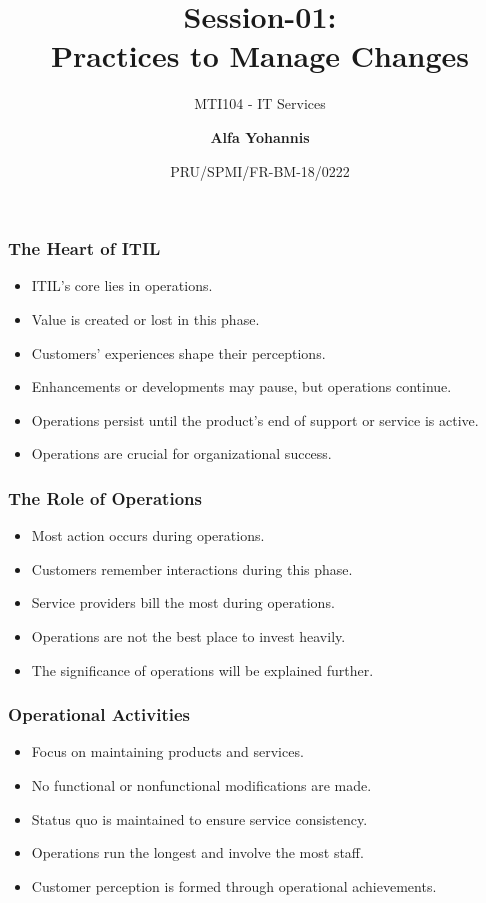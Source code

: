 \documentclass[aspectratio=169, table]{beamer}
\subtitle{MTI104 - IT Services}
\title{Session-01:\\\LARGE{Practices to Manage Changes\\}}
\date[Serial]{\scriptsize {PRU/SPMI/FR-BM-18/0222}}
\author[Pradita]{\small{\textbf{Alfa Yohannis}}}
\begin{document}
\frame{\titlepage}

\begin{frame}
	\frametitle{The Heart of ITIL}
	
	\begin{itemize}
		\item ITIL's core lies in operations.
		\item Value is created or lost in this phase.
		\item Customers' experiences shape their perceptions.
		\item Enhancements or developments may pause, but operations continue.
		\item Operations persist until the product’s end of support or service is active.
		\item Operations are crucial for organizational success.
	\end{itemize}
\end{frame}

\begin{frame}
	\frametitle{The Role of Operations}
	
	\begin{itemize}
		\item Most action occurs during operations.
		\item Customers remember interactions during this phase.
		\item Service providers bill the most during operations.
		\item Operations are not the best place to invest heavily.
		\item The significance of operations will be explained further.
	\end{itemize}
\end{frame}

\begin{frame}
	\frametitle{Operational Activities}
	
	\begin{itemize}
		\item Focus on maintaining products and services.
		\item No functional or nonfunctional modifications are made.
		\item Status quo is maintained to ensure service consistency.
		\item Operations run the longest and involve the most staff.
		\item Customer perception is formed through operational achievements.
	\end{itemize}
\end{frame}
\end{document}
